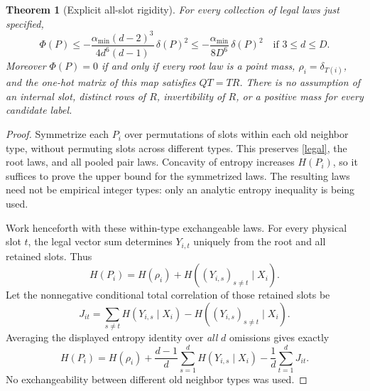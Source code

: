 \documentclass[11pt]{article}
\newtheorem{theorem}{Theorem}
\begin{document}
\begin{theorem}[Explicit all-slot rigidity]
For every collection of legal laws just specified,
\begin{equation}
 \Phi(P)\leq
 -\frac{\alpha_{\min}(d-2)^3}{4d^6(d-1)}\,\delta(P)^2
 \leq -\frac{\alpha_{\min}}{8D^6}\,\delta(P)^2
 \quad\text{if }3\leq d\leq D.                    \label{gap}
\end{equation}
Moreover $\Phi(P)=0$ if and only if every root law is a point mass,
$\rho_i=\delta_{T(i)}$, and the one-hot matrix of this map satisfies
$QT=TR$. There is no assumption of an internal slot, distinct rows of
$R$, invertibility of $R$, or a positive mass for every candidate label.
\end{theorem}

\begin{proof}
Symmetrize each $P_i$ over permutations of slots within each old neighbor
type, without permuting slots across different types. This preserves
\eqref{legal}, the root laws, and all pooled pair laws. Concavity of
entropy increases $H(P_i)$, so it suffices to prove the upper bound for
the symmetrized laws. The resulting laws need not be empirical integer
types: only an analytic entropy inequality is being used.

Work henceforth with these within-type exchangeable laws. For every
physical slot $t$, the legal vector sum determines $Y_{i,t}$ uniquely
from the root and all retained slots. Thus
\[
 H(P_i)=H(\rho_i)+H((Y_{i,s})_{s\ne t}\mid X_i).
\]
Let the nonnegative conditional total correlation of those retained
slots be
\[
 J_{it}=\sum_{s\ne t}H(Y_{i,s}\mid X_i)
                  -H((Y_{i,s})_{s\ne t}\mid X_i).
\]
Averaging the displayed entropy identity over \emph{all} $d$ omissions
gives exactly
\begin{equation}
 H(P_i)=H(\rho_i)+\frac{d-1}{d}\sum_{s=1}^d
 H(Y_{i,s}\mid X_i)-\frac1d\sum_{t=1}^dJ_{it}.
                                                        \label{average}
\end{equation}
No exchangeability between different old neighbor types was used.


\end{proof}
\end{document}

